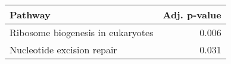 \begin{tabular}{lr}
\toprule
                           Pathway &  Adj. p-value \\
\midrule
 Ribosome biogenesis in eukaryotes &         0.006 \\
        Nucleotide excision repair &         0.031 \\
\bottomrule
\end{tabular}
